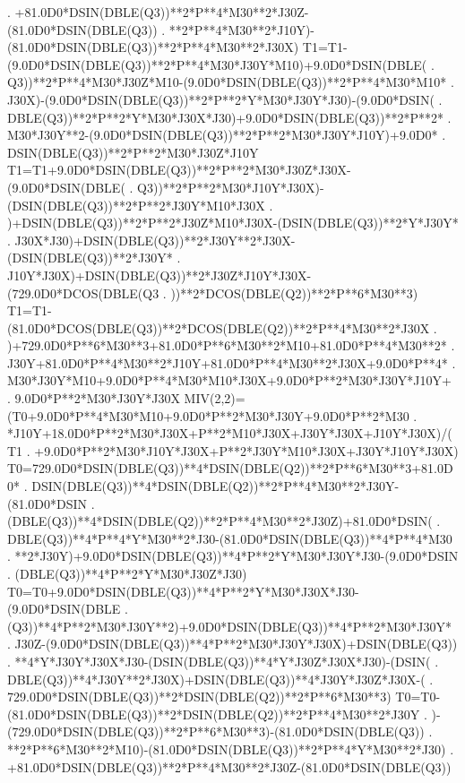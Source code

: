 \begin{framedverbatim}
     . +81.0D0*DSIN(DBLE(Q3))**2*P**4*M30**2*J30Z-(81.0D0*DSIN(DBLE(Q3))
     . **2*P**4*M30**2*J10Y)-(81.0D0*DSIN(DBLE(Q3))**2*P**4*M30**2*J30X)
      T1=T1-(9.0D0*DSIN(DBLE(Q3))**2*P**4*M30*J30Y*M10)+9.0D0*DSIN(DBLE(
     . Q3))**2*P**4*M30*J30Z*M10-(9.0D0*DSIN(DBLE(Q3))**2*P**4*M30*M10*
     . J30X)-(9.0D0*DSIN(DBLE(Q3))**2*P**2*Y*M30*J30Y*J30)-(9.0D0*DSIN(
     . DBLE(Q3))**2*P**2*Y*M30*J30X*J30)+9.0D0*DSIN(DBLE(Q3))**2*P**2*
     . M30*J30Y**2-(9.0D0*DSIN(DBLE(Q3))**2*P**2*M30*J30Y*J10Y)+9.0D0*
     . DSIN(DBLE(Q3))**2*P**2*M30*J30Z*J10Y
      T1=T1+9.0D0*DSIN(DBLE(Q3))**2*P**2*M30*J30Z*J30X-(9.0D0*DSIN(DBLE(
     . Q3))**2*P**2*M30*J10Y*J30X)-(DSIN(DBLE(Q3))**2*P**2*J30Y*M10*J30X
     . )+DSIN(DBLE(Q3))**2*P**2*J30Z*M10*J30X-(DSIN(DBLE(Q3))**2*Y*J30Y*
     . J30X*J30)+DSIN(DBLE(Q3))**2*J30Y**2*J30X-(DSIN(DBLE(Q3))**2*J30Y*
     . J10Y*J30X)+DSIN(DBLE(Q3))**2*J30Z*J10Y*J30X-(729.0D0*DCOS(DBLE(Q3
     . ))**2*DCOS(DBLE(Q2))**2*P**6*M30**3)
      T1=T1-(81.0D0*DCOS(DBLE(Q3))**2*DCOS(DBLE(Q2))**2*P**4*M30**2*J30X
     . )+729.0D0*P**6*M30**3+81.0D0*P**6*M30**2*M10+81.0D0*P**4*M30**2*
     . J30Y+81.0D0*P**4*M30**2*J10Y+81.0D0*P**4*M30**2*J30X+9.0D0*P**4*
     . M30*J30Y*M10+9.0D0*P**4*M30*M10*J30X+9.0D0*P**2*M30*J30Y*J10Y+
     . 9.0D0*P**2*M30*J30Y*J30X
      MIV(2,2)=(T0+9.0D0*P**4*M30*M10+9.0D0*P**2*M30*J30Y+9.0D0*P**2*M30
     . *J10Y+18.0D0*P**2*M30*J30X+P**2*M10*J30X+J30Y*J30X+J10Y*J30X)/(T1
     . +9.0D0*P**2*M30*J10Y*J30X+P**2*J30Y*M10*J30X+J30Y*J10Y*J30X)
      T0=729.0D0*DSIN(DBLE(Q3))**4*DSIN(DBLE(Q2))**2*P**6*M30**3+81.0D0*
     . DSIN(DBLE(Q3))**4*DSIN(DBLE(Q2))**2*P**4*M30**2*J30Y-(81.0D0*DSIN
     . (DBLE(Q3))**4*DSIN(DBLE(Q2))**2*P**4*M30**2*J30Z)+81.0D0*DSIN(
     . DBLE(Q3))**4*P**4*Y*M30**2*J30-(81.0D0*DSIN(DBLE(Q3))**4*P**4*M30
     . **2*J30Y)+9.0D0*DSIN(DBLE(Q3))**4*P**2*Y*M30*J30Y*J30-(9.0D0*DSIN
     . (DBLE(Q3))**4*P**2*Y*M30*J30Z*J30)
      T0=T0+9.0D0*DSIN(DBLE(Q3))**4*P**2*Y*M30*J30X*J30-(9.0D0*DSIN(DBLE
     . (Q3))**4*P**2*M30*J30Y**2)+9.0D0*DSIN(DBLE(Q3))**4*P**2*M30*J30Y*
     . J30Z-(9.0D0*DSIN(DBLE(Q3))**4*P**2*M30*J30Y*J30X)+DSIN(DBLE(Q3))
     . **4*Y*J30Y*J30X*J30-(DSIN(DBLE(Q3))**4*Y*J30Z*J30X*J30)-(DSIN(
     . DBLE(Q3))**4*J30Y**2*J30X)+DSIN(DBLE(Q3))**4*J30Y*J30Z*J30X-(
     . 729.0D0*DSIN(DBLE(Q3))**2*DSIN(DBLE(Q2))**2*P**6*M30**3)
      T0=T0-(81.0D0*DSIN(DBLE(Q3))**2*DSIN(DBLE(Q2))**2*P**4*M30**2*J30Y
     . )-(729.0D0*DSIN(DBLE(Q3))**2*P**6*M30**3)-(81.0D0*DSIN(DBLE(Q3))
     . **2*P**6*M30**2*M10)-(81.0D0*DSIN(DBLE(Q3))**2*P**4*Y*M30**2*J30)
     . +81.0D0*DSIN(DBLE(Q3))**2*P**4*M30**2*J30Z-(81.0D0*DSIN(DBLE(Q3))

\end{framedverbatim}
